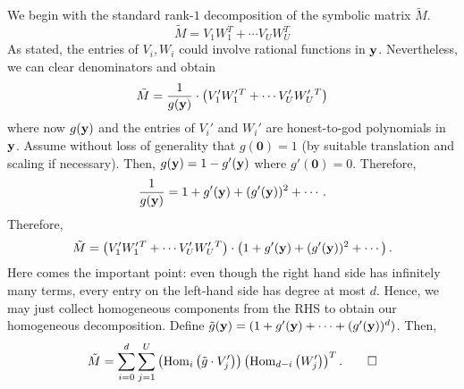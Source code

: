 We begin with the standard rank-$1$ decomposition of the symbolic matrix $\tilde{M}$.
\[
  \tilde{M} = V_1 W_1^T + \cdots V_U W_U^T
\]
As stated, the entries of $V_i,W_i$ could involve rational functions in $\mathbf{y}$. Nevertheless, we can clear denominators and obtain
\[
\tilde{M} = \frac{1}{g(\mathbf{y})} \cdot \left(V'_1 W'_1{}^T + \cdots V'_U W'_U{}^T\right)
\]
where now $g(\mathbf{y})$ and the entries of $V_i'$ and $W_i'$ are honest-to-god polynomials in $\mathbf{y}$. Assume without loss of generality that $g(\mathbf{0}) = 1$ (by suitable translation and scaling if necessary). Then, $g(\mathbf{y}) = 1 - g'(\mathbf{y})$ where $g'(\mathbf{0}) = 0$. Therefore,
\[
\frac{1}{g(\mathbf{y})} = 1 + g'(\mathbf{y}) + (g'(\mathbf{y}))^2 + \cdots . 
\]
Therefore, 
\[
  \tilde{M} = \left(V'_1 W'_1{}^T + \cdots V'_U W'_U{}^T\right) \cdot \left(1 + g'(\mathbf{y}) + (g'(\mathbf{y}))^2 + \cdots\right).
\]
Here comes the important point: even though the right hand side has infinitely many terms, every entry on the left-hand side has degree at most $d$. Hence, we may just collect homogeneous components from the RHS to obtain our homogeneous decomposition. Define $\tilde{g}(\mathbf{y}) = (1 + g'(\mathbf{y}) + \cdots + (g'(\mathbf{y}))^d)$. Then,
\[
  \tilde{M} = \sum_{i=0}^d \sum_{j=1}^U \left(\operatorname{Hom}_{ i}\left(\tilde{g} \cdot V_j'\right)\right) \left(\operatorname{Hom}_{d - i}\left(W_j'\right)\right)^T. \qed
\]


